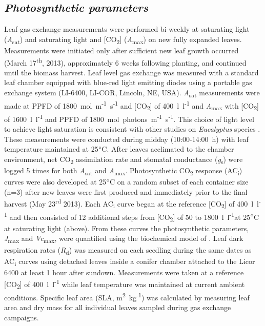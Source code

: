 \documentclass[a4paper]{article}\usepackage[]{graphicx}\usepackage[]{color}
\begin{document}
\subsection*{\textit{Photosynthetic parameters}}
Leaf gas exchange measurements were performed bi-weekly at saturating light (\textit{A}\textsubscript{sat}) and saturating light and [CO\textsubscript{2}] (\textit{A}\textsubscript{max}) on new fully expanded leaves. Measurements were initiated only after sufficient new leaf growth occurred (March 17\textsuperscript{th}, 2013), approximately 6 weeks following planting, and continued until the biomass harvest. Leaf level gas exchange was measured with a standard leaf chamber equipped with blue-red light emitting diodes using a portable gas exchange system (LI-6400, LI-COR, Lincoln, NE, USA). \textit{A}\textsubscript{sat} measurements were made at PPFD of 1800~{\textmugreek}mol~m\textsuperscript{-1}~s\textsuperscript{-1} and [CO\textsubscript{2}] of 400~{\textmugreek}l~l\textsuperscript{-1} and \textit{A}\textsubscript{max} with [CO\textsubscript{2}] of 1600~{\textmugreek}l~l\textsuperscript{-1} and PPFD of 1800~{\textmugreek}mol~photons~m\textsuperscript{-1}~s\textsuperscript{-1}. This choice of light level to achieve light saturation is consistent with other studies on \textit{Eucalyptus} species \citep{kallarackal1997ecophysiological,pinkard1998photosynthetic,crous2013photosynthesis,drake2014capacity}. These measurements were conducted during midday (10:00-14:00~h) with leaf temperature maintained at 25$\degree$C. After leaves acclimated to the chamber environment, net CO\textsubscript{2} assimilation rate and stomatal conductance (\textit{g}\textsubscript{s}) were logged 5 times for both \textit{A}\textsubscript{sat} and \textit{A}\textsubscript{max}. Photosynthetic CO\textsubscript{2} response (AC\textsubscript{i}) curves were also developed at 25$\degree$C on a random subset of each container size (n=3) after new leaves were first produced and immediately prior to the final harvest (May 23\textsuperscript{rd} 2013). Each AC\textsubscript{i} curve began at the reference [CO\textsubscript{2}] of 400~{\textmugreek}l~l\textsuperscript{-1} and then consisted of 12 additional steps from [CO\textsubscript{2}] of 50 to 1800~{\textmugreek}l~l\textsuperscript{-1}at 25$\degree$C at saturating light (above). From these curves the photosynthetic parameters, \textit{J}\textsubscript{max} and \textit{Vc}\textsubscript{max}, were quantified using the biochemical model of \citet{farquhar1980biochemical}. Leaf dark respiration rates (\textit{R}\textsubscript{d}) was measured on each seedling during the same dates as AC\textsubscript{i} curves using detached leaves inside a conifer chamber attached to the Licor 6400 at least 1 hour after sundown.   Measurements were taken at a reference [CO\textsubscript{2}] of 400~{\textmugreek}l~l\textsuperscript{-1} while leaf temperature was maintained at current ambient conditions. Specific leaf area (SLA, m\textsuperscript{2}~kg\textsuperscript{-1}) was calculated by measuring leaf area and dry mass for all individual leaves sampled during gas exchange campaigns.
\end{document}
